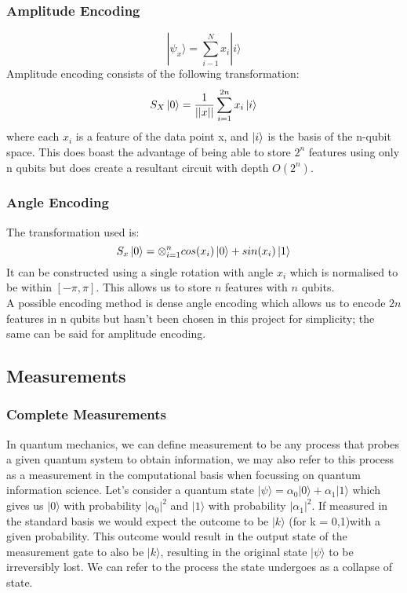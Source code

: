 \documentclass{article}
\numberwithin{equation}{section}
\begin{document}
\begin{Abstract}
\subsubsection{Amplitude Encoding}
$$ |\psi_x\rangle = \sum_{i-1}^Nx_i|i\rangle$$
Amplitude encoding consists of the following transformation:\\
$$S_X \ket{0} = \frac{1}{||x||}\sum^{2n}_{i=1}{x_i\ket{i}}$$
where each $x_i$ is a feature of the data point x, and $\ket{i}$ is the basis 
of the n-qubit
space. This does boast the advantage of being able to store $2^n$ features using 
only n qubits but does create a resultant circuit with depth $O(2^n)$.

\subsubsection{Angle Encoding}
The transformation used is:
$$S_x\ket{0} = \otimes^n_{i=1} cos(x_i)\ket{0} + sin(x_i)\ket{1}$$
It can be constructed using a single rotation with angle $x_i$ which is 
normalised to be within $[-\pi,\pi]$. This allows us to store $n$ features with 
$n$ qubits.
\\
A possible encoding method is dense angle encoding which allows us to encode $2n$ 
features in n qubits but hasn't been chosen in this project for simplicity; the 
same can be said for amplitude encoding.


\subsection{Measurements}
\subsubsection{Complete Measurements}
In quantum mechanics, we can define measurement to be any process that probes a 
given quantum system to obtain information, we may also refer to this process as 
a measurement in the computational basis when focussing on quantum information 
science. Let's consider a quantum state 
$|\psi \rangle = \alpha_0|0\rangle+\alpha_1|1\rangle$ which gives us $|0\rangle$
with probability $|\alpha_0|^2$ and $|1\rangle$ with probability $|\alpha_1|^2$. 
If measured in the standard basis we would expect the outcome to be $|k\rangle$
(for k = 0,1)with a given probability. This outcome would result in the output 
state of the measurement gate to also be $|k\rangle$, resulting in the original 
state $|\psi\rangle$ to be irreversibly lost. We can refer to the process the state 
undergoes as a collapse of state. 



\end{Abstract}
\end{document}

